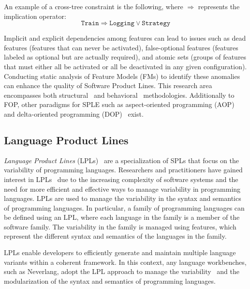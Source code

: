 An example of a cross-tree constraint is the following, where $\Rightarrow$ represents the implication operator:
\begin{equation*}
    \texttt{Train} \Rightarrow \texttt{Logging} \vee \texttt{Strategy}
\end{equation*}

Implicit and explicit dependencies among features can lead to issues such as dead features (features that can never be activated), false-optional features (features labeled as optional but are actually required), and atomic sets (groups of features that must either all be activated or all be deactivated in any given configuration). Conducting static analysis of Feature Models (FMs) to identify these anomalies can enhance the quality of Software Product Lines. This research area encompasses both structural~\cite{TerBeek21} and behavioral~\cite{Benavides10} methodologies.
 Additionally to FOP, other paradigms for SPLE such as aspect-oriented programming (AOP)~\cite{Groher09} and delta-oriented programming (DOP)~\cite{Koscielny14} exist.

\subsection{Language Product Lines}\label{subsec:background:LanguageProductLines}

\textit{Language Product Lines} (LPLs)~\cite{Mendez-Acuna16, Cazzola16i, Cazzola15f, Cazzola13g} are a specialization of SPLs that focus on the variability of programming languages. Researchers and practitioners have gained interest in LPLs~\cite{Cazzola17, Ghosh11b, Kuehn14} due to the increasing complexity of software systems and the need for more efficient and effective ways to manage variability in programming languages.
LPLs are used to manage the variability in the syntax and semantics of programming languages. In particular, a family of programming languages can be defined using an LPL, where each language in the family is a member of the software family. The variability in the family is managed using features, which represent the different syntax and semantics of the languages in the family.

LPLs enable developers to efficiently generate and maintain multiple language variants within a coherent framework.
In this context, any language workbenches, such as Neverlang, adopt the LPL approach to manage the variability~\cite{Klint09b, Cazzola13g} and the modularization of the syntax and semantics of programming languages.

